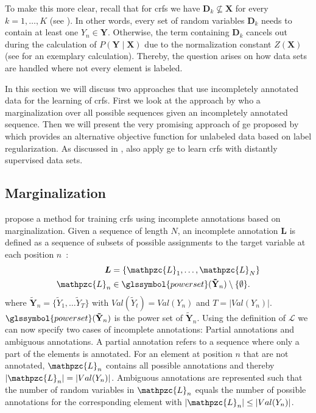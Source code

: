 To make this more clear, recall that for \glspl{crf} we have $\mathbf{D}_k\not\subseteq\mathbf{X}$ for every $k=1,\dots,K$ (see ).
In other words, every set of \glspl{random variable} $\mathbf{D}_k$ needs to contain at least one $Y_n\in\mathbf{Y}$.
Otherwise, the term containing $\mathbf{D}_k$ cancels out during the calculation of $P(\mathbf{Y}\mid\mathbf{X})$ due to the normalization constant $Z(\mathbf{X})$ (see  for an exemplary calculation).
Thereby, the question arises on how data sets are handled where not every element is labeled.

In this section we will discuss two approaches that use incompletely annotated data for the learning of \glspl{crf}.
First we look at the approach by \citet{tsuboi2008training} who a marginalization over all possible sequences given an incompletely annotated sequence.
Then we will present the very promising approach of \acrfull{ge} proposed by \citet{mann2007simple} which provides an alternative \gls{objective function} for unlabeled data based on \gls{label regularization}.
As discussed in , \citet{lu2013web} also apply \gls{ge} to learn \glspl{crf} with distantly supervised data sets.

\subsection{Marginalization}

\citet{tsuboi2008training} propose a method for training \glspl{crf} using incomplete annotations based on marginalization.
Given a sequence of length $N$, an incomplete annotation $\bm{L}$ is defined as a sequence of subsets of possible assignments to the \gls{target variable} at each position $n$~\citep{tsuboi2008training}:
\begin{equation}
  \label{equ:incomplete-annotation}
  \begin{split}
    \bm{L}&= \left\{\mathpzc{L}_1,\dots,\mathpzc{L}_N\right\}\\
    \mathpzc{L}_n&\in\glssymbol{power set}(\mathbf{\tilde{Y}}_n)\setminus \{\emptyset\}.
  \end{split}
\end{equation}
where $\mathbf{\tilde{Y}}_n{=}\{\tilde{Y}_1,\dots\tilde{Y}_T\}$ with $Val(\tilde{Y}_t){=}Val(Y_n)$ and $T{=}|Val(Y_n)|$.
$\glssymbol{power set}(\mathbf{\tilde{Y}}_n)$ is the \gls{power set} of $\mathbf{\tilde{Y}}_n$.
Using the definition of $\mathcal{L}$ we can now specify two cases of incomplete annotations: Partial annotations and ambiguous annotations.
A partial annotation refers to a sequence where only a part of the elements is annotated.
For an element at position $n$ that are not annotated, $\mathpzc{L}_n$ contains all possible annotations and thereby $|\mathpzc{L}_n|=|Val(Y_n)|$.
Ambiguous annotations are represented such that the number of \glspl{random variable} in $\mathpzc{L}_n$ equals the number of possible annotations for the corresponding element with $|\mathpzc{L}_n|\leq |Val(Y_n)|$.

